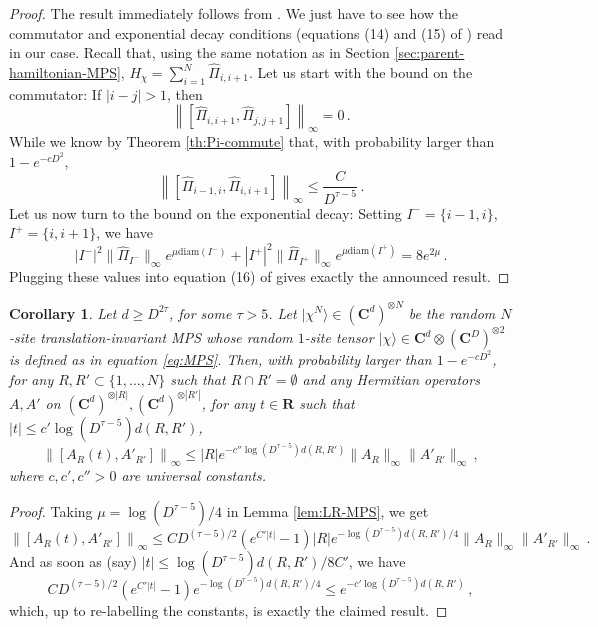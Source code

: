 \documentclass{amsart}
\newtheorem{corollary}[theorem]{Corollary}
\newcommand{\R}{\mathbf{R}}
\newcommand{\C}{\mathbf{C}}
\renewcommand{\leq}{\leqslant}
\renewcommand{\geq}{\geqslant}
\newcommand{\ket}[1]{| #1 \rangle}
\begin{document}
\begin{proof}
    The result immediately follows from \cite[Lemma 12]{HHKL}. We just have to see how the commutator and exponential decay conditions (equations (14) and (15) of \cite{HHKL}) read in our case.
    Recall that, using the same notation as in Section \ref{sec:parent-hamiltonian-MPS}, $H_{\chi} = \sum_{i=1}^N \hat{\Pi}_{i,i+1}$. Let us start with the bound on the commutator: If $|i-j|>1$, then
    \[  \left\| \left[ \hat{\Pi}_{i,i+1},\hat{\Pi}_{j,j+1} \right] \right\|_{\infty}=0 \, . \]
    While we know by Theorem \ref{th:Pi-commute} that, with probability larger than $1-e^{-cD^2}$,
    \[  \left\| \left[ \hat{\Pi}_{i-1,i},\hat{\Pi}_{i,i+1} \right] \right\|_{\infty} \leq \frac{C}{D^{\tau-5}} \, . \]
    Let us now turn to the bound on the exponential decay: Setting $I^-=\{i-1,i\}$, $I^+=\{i,i+1\}$, we have
    \[ |I^-|^2\|\hat{\Pi}_{I^-}\|_{\infty}e^{\mu\mathrm{diam}(I^-)} + |I^+|^2\|\hat{\Pi}_{I^+}\|_{\infty}e^{\mu\mathrm{diam}(I^+)} = 8e^{2\mu} \, . \]
    Plugging these values into equation (16) of \cite{HHKL} gives exactly the announced result.
\end{proof}

\begin{corollary} \label{cor:LR-MPS}
    Let $d\geq D^{2\tau}$, for some $\tau>5$. Let $\ket{\chi^{N}}\in(\C^d)^{\otimes N}$ be the random $N$-site translation-invariant MPS whose random $1$-site tensor $\ket{\chi}\in\C^d\otimes(\C^D)^{\otimes 2}$ is defined as in equation \eqref{eq:MPS}. Then, with probability larger than $1-e^{-cD^2}$, for any $R,R'\subset\{1,\ldots,N\}$ such that $R\cap R'=\emptyset$ and any Hermitian operators $A,A'$ on $(\C^d)^{\otimes |R|},(\C^d)^{\otimes |R'|}$, for any $t\in\R$ such that $|t|\leq c'\log(D^{\tau-5})d(R,R')$,
    \[ \left\| \left[ A_R(t),A'_{R'} \right] \right\|_{\infty} \leq  |R|e^{-c''\log(D^{\tau-5}) d(R,R')} \|A_R\|_{\infty}\|A'_{R'}\|_{\infty} \, , \]
    where $c,c',c''>0$ are universal constants.
\end{corollary}

\begin{proof}
    Taking $\mu=\log(D^{\tau-5})/4$ in Lemma \ref{lem:LR-MPS}, we get
    \[ \left\| \left[ A_R(t),A'_{R'} \right] \right\|_{\infty} \leq CD^{(\tau-5)/2} \left( e^{C'|t|} -1 \right) |R|e^{-\log(D^{\tau-5}) d(R,R')/4} \|A_R\|_{\infty}\|A'_{R'}\|_{\infty} \, . \]
    And as soon as (say) $|t|\leq \log(D^{\tau-5}) d(R,R')/8C'$, we have
    \[ CD^{(\tau-5)/2} \left( e^{C'|t|} -1 \right)e^{-\log(D^{\tau-5}) d(R,R')/4} \leq e^{-c'\log(D^{\tau-5}) d(R,R')} \, , \]
    which, up to re-labelling the constants, is exactly the claimed result.
\end{proof}
\end{document}
